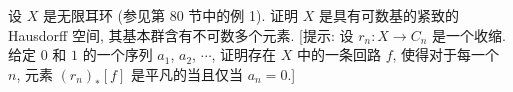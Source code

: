 \begin{exercise}
\label{exercise:ch13-extra-05}
设 $X$ 是无限耳环 (参见第 80 节中的例 1). 证明 $X$ 是具有可数基的紧致的 Hausdorff 空间, 其基本群含有不可数多个元素. [提示: 设 $r_{n}\colon X\to C_{n}$ 是一个收缩. 给定 $0$ 和 $1$ 的一个序列 $a_{1}$, $a_{2}$, $\cdots$, 证明存在 $X$ 中的一条回路 $f$, 使得对于每一个 $n$, 元素 $(r_{n})_{*}[f]$ 是平凡的当且仅当 $a_{n}=0$.]
\end{exercise}
